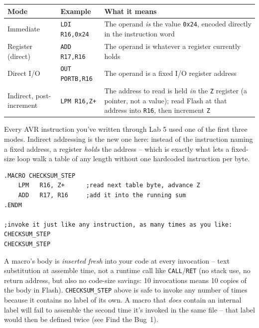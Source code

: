 \documentclass[11pt]{article}
\begin{document}
\begin{summary}
\begin{center}
\begin{tabular}{@{}p{3.6cm}p{3.6cm}p{6.7cm}@{}}
\toprule
\textbf{Mode} & \textbf{Example} & \textbf{What it means} \\
\midrule
Immediate & \texttt{LDI R16,0x24} & The operand \emph{is} the value \texttt{0x24},
encoded directly in the instruction word \\
Register (direct) & \texttt{ADD R17,R16} & The operand is whatever a register
currently holds \\
Direct I/O & \texttt{OUT PORTB,R16} & The operand is a fixed I/O register address \\
Indirect, post-increment & \texttt{LPM R16,Z+} & The address to read is held
\emph{in} the \texttt{Z} register (a pointer, not a value); read Flash at that
address into \texttt{R16}, then increment \texttt{Z} \\
\bottomrule
\end{tabular}
\end{center}
Every AVR instruction you've written through Lab 5 used one of the first three
modes. Indirect addressing is the new one here: instead of the instruction naming
a fixed address, a register \emph{holds} the address -- which is exactly what lets
a fixed-size loop walk a table of any length without one hardcoded instruction per
byte.
\end{summary}

\begin{summary}
\begin{lstlisting}
.MACRO CHECKSUM_STEP
    LPM   R16, Z+      ;read next table byte, advance Z
    ADD   R17, R16     ;add it into the running sum
.ENDM

;invoke it just like any instruction, as many times as you like:
CHECKSUM_STEP
CHECKSUM_STEP
\end{lstlisting}
A macro's body is \emph{inserted fresh} into your code at every invocation --
text substitution at assemble time, not a runtime call like \texttt{CALL}/\texttt{RET}
(no stack use, no return address, but also no code-size savings: 10 invocations
means 10 copies of the body in Flash). \texttt{CHECKSUM\_STEP} above is safe to
invoke any number of times because it contains no label of its own. A macro that
\emph{does} contain an internal label will fail to assemble the second time it's
invoked in the same file -- that label would then be defined twice (see Find the
Bug~1).
\end{summary}
\end{document}
